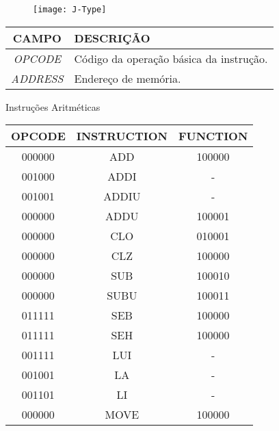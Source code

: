   	\begin{figure}[H]
    	\centering
    	\texttt{[image: J-Type]}
		\label{jump}
  	\end{figure}
  	
  	\begin{table}[H]
\centering	
\begin{tabular}{|c|l|}
	\hline 
	\cellcolor[gray]{0.9}\textbf{CAMPO} & \cellcolor[gray]{0.9}\textbf{DESCRIÇÃO} \\ 
	\hline 
	\textit{OPCODE} & Código da operação básica da instrução. \\ 
	\hline 
	\textit{ADDRESS} & Endereço de memória. \\ 
	\hline 
	\end{tabular} 
	\end{table}

Instruções Aritméticas
\begin{table}[H]
\centering
	\begin{tabular}{|c|c|c|}
  	\hline 
  	\cellcolor[gray]{0.9}\textbf{OPCODE} & \cellcolor[gray]{0.9}\textbf{INSTRUCTION} & \cellcolor[gray]{0.9}\textbf{FUNCTION} \\ 
  	\hline 
  	000000 & ADD & 100000 \\ 
  	\hline 
  	001000 & ADDI & -\\ 
  	\hline 
  	001001 & ADDIU & - \\ 
  	\hline 
  	000000 & ADDU & 100001 \\ 
  	\hline 
  	000000 & CLO & 010001 \\ 
  	\hline 
  	000000 & CLZ & 100000 \\ 
  	\hline  
  	000000 & SUB & 100010 \\ 
  	\hline
  	000000 & SUBU & 100011 \\
  	\hline 
  	011111 & SEB & 100000 \\
  	\hline 
  	011111 & SEH & 100000 \\
  	\hline 
  	001111 & LUI & - \\
  	\hline 
  	001001 & LA & - \\
  	\hline
  	001101 & LI & - \\
  	\hline
  	000000 & MOVE & 100000 \\
  	\hline
  	
  	\end{tabular} 
  \end{table} 
  	 	
